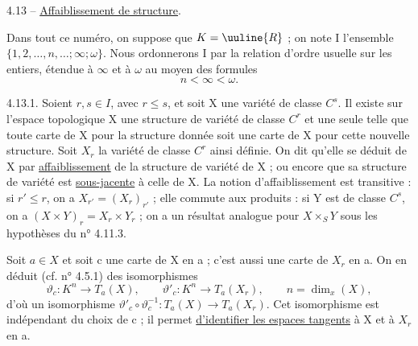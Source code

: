 4.13 -- \uline{Affaiblissement de structure}.

Dans tout ce numéro, on suppose que $K=\uuline{R}$ ; on note I l'ensemble $\{1,2,\ldots,n,\ldots;\infty;\omega\}$. Nous ordonnerons I par la relation d'ordre usuelle sur les entiers, étendue à $\infty$ et à $\omega$ au moyen des formules
\[
n<\infty<\omega.
\]

4.13.1. Soient $r,s\in I$, avec $r\leq s$, et soit X une variété de classe $C^s$. Il existe sur l'espace topologique X une structure de variété de classe $C^r$ et une seule telle que toute carte de X pour la structure donnée soit une carte de X pour cette nouvelle structure. Soit $X_r$ la variété de classe $C^r$ ainsi définie. On dit qu'elle se déduit de X par \uline{affaiblissement} de la structure de variété de X ; ou encore que sa structure de variété est \uline{sous-jacente} à celle de X. La notion d'affaiblissement est transitive : si $r'\leq r$, on a $X_{r'}=(X_r)_{r'}$ ; elle commute aux produits : si Y est de classe $C^s$, on a $(X\times Y)_r=X_r\times Y_r$ ; on a un résultat analogue pour $X\times_S Y$ sous les hypothèses du n° 4.11.3.

Soit $a\in X$ et soit c une carte de X en a ; c'est aussi une carte de $X_r$ en a. On en déduit (cf. n° 4.5.1) des isomorphismes
\[
\vartheta_c:K^n\longrightarrow T_a(X),\qquad
\vartheta'_c:K^n\longrightarrow T_a(X_r),\qquad n=\dim_x(X),
\]
d'où un isomorphisme $\vartheta'_c\circ\vartheta_c^{-1}:T_a(X)\longrightarrow T_a(X_r)$. Cet isomorphisme est indépendant du choix de c ; il permet \uline{d'identifier les espaces tangents} à X et à $X_r$ en a.

